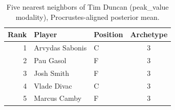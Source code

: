 \begin{table}[htbp]
  \centering\small
  \begin{tabular}{rllc}
    \toprule
    Rank & Player & Position & Archetype \\
    \midrule
    1 & Arvydas Sabonis & C & 3 \\
    2 & Pau Gasol & F & 3 \\
    3 & Josh Smith & F & 3 \\
    4 & Vlade Divac & C & 3 \\
    5 & Marcus Camby & F & 3 \\
    \bottomrule
  \end{tabular}
  \caption{Five nearest neighbors of Tim Duncan (peak_value modality), Procrustes-aligned posterior mean.}
  \label{tab:Tim_Duncan_neighbors_peak_value}
\end{table}

